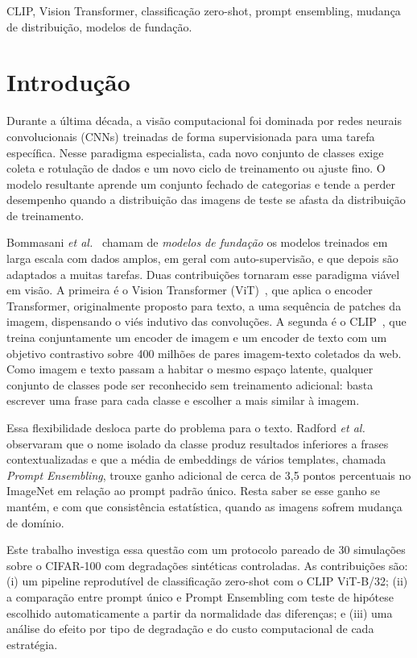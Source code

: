 \documentclass[conference]{IEEEtran}
\begin{document}
\begin{IEEEkeywords}
CLIP, Vision Transformer, classificação zero-shot, prompt ensembling, mudança de distribuição, modelos de fundação.
\end{IEEEkeywords}

\section{Introdução}

Durante a última década, a visão computacional foi dominada por redes neurais convolucionais (CNNs) treinadas de forma supervisionada para uma tarefa específica. Nesse paradigma especialista, cada novo conjunto de classes exige coleta e rotulação de dados e um novo ciclo de treinamento ou ajuste fino. O modelo resultante aprende um conjunto fechado de categorias e tende a perder desempenho quando a distribuição das imagens de teste se afasta da distribuição de treinamento.

Bommasani \textit{et al.}~\cite{bommasani2021} chamam de \textit{modelos de fundação} os modelos treinados em larga escala com dados amplos, em geral com auto-supervisão, e que depois são adaptados a muitas tarefas. Duas contribuições tornaram esse paradigma viável em visão. A primeira é o Vision Transformer (ViT)~\cite{dosovitskiy2020}, que aplica o encoder Transformer, originalmente proposto para texto, a uma sequência de patches da imagem, dispensando o viés indutivo das convoluções. A segunda é o CLIP~\cite{radford2021}, que treina conjuntamente um encoder de imagem e um encoder de texto com um objetivo contrastivo sobre 400 milhões de pares imagem-texto coletados da web. Como imagem e texto passam a habitar o mesmo espaço latente, qualquer conjunto de classes pode ser reconhecido sem treinamento adicional: basta escrever uma frase para cada classe e escolher a mais similar à imagem.

Essa flexibilidade desloca parte do problema para o texto. Radford \textit{et al.}~\cite{radford2021} observaram que o nome isolado da classe produz resultados inferiores a frases contextualizadas e que a média de embeddings de vários templates, chamada \textit{Prompt Ensembling}, trouxe ganho adicional de cerca de 3,5 pontos percentuais no ImageNet em relação ao prompt padrão único. Resta saber se esse ganho se mantém, e com que consistência estatística, quando as imagens sofrem mudança de domínio.

Este trabalho investiga essa questão com um protocolo pareado de 30 simulações sobre o CIFAR-100 com degradações sintéticas controladas. As contribuições são: (i) um pipeline reprodutível de classificação zero-shot com o CLIP ViT-B/32; (ii) a comparação entre prompt único e Prompt Ensembling com teste de hipótese escolhido automaticamente a partir da normalidade das diferenças; e (iii) uma análise do efeito por tipo de degradação e do custo computacional de cada estratégia.
\end{document}

